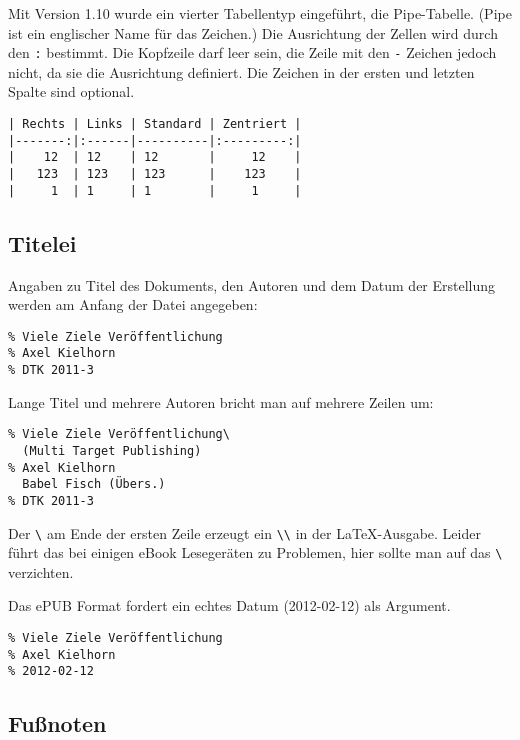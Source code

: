\documentclass[11pt,ngerman,a4paper]{article}
\begin{document}
Mit Version 1.10 wurde ein vierter Tabellentyp eingeführt, die
Pipe-Tabelle. (Pipe ist ein englischer Name für das \texttt{\textbar{}}
Zeichen.) Die Ausrichtung der Zellen wird durch den \texttt{:} bestimmt.
Die Kopfzeile darf leer sein, die Zeile mit den \texttt{-} Zeichen
jedoch nicht, da sie die Ausrichtung definiert. Die \texttt{\textbar{}}
Zeichen in der ersten und letzten Spalte sind optional.

\begin{verbatim}
| Rechts | Links | Standard | Zentriert | 
|-------:|:------|----------|:---------:| 
|    12  | 12    | 12       |     12    | 
|   123  | 123   | 123      |    123    |
|     1  | 1     | 1        |     1     |
\end{verbatim}

\subsection{Titelei}

Angaben zu Titel des Dokuments, den Autoren und dem Datum der Erstellung
werden am Anfang der Datei angegeben:

\begin{verbatim}
% Viele Ziele Veröffentlichung
% Axel Kielhorn
% DTK 2011-3
\end{verbatim}

Lange Titel und mehrere Autoren bricht man auf mehrere Zeilen um:

\begin{verbatim}
% Viele Ziele Veröffentlichung\
  (Multi Target Publishing)
% Axel Kielhorn
  Babel Fisch (Übers.)
% DTK 2011-3
\end{verbatim}

Der \texttt{\textbackslash{}} am Ende der ersten Zeile erzeugt ein
\texttt{\textbackslash{}\textbackslash{}} in der LaTeX-Ausgabe. Leider
führt das bei einigen eBook Lesegeräten zu Problemen, hier sollte man
auf das \texttt{\textbackslash{}} verzichten.

Das ePUB Format fordert ein echtes Datum (2012-02-12) als Argument.

\begin{verbatim}
% Viele Ziele Veröffentlichung
% Axel Kielhorn
% 2012-02-12
\end{verbatim}

\subsection{Fußnoten}
\end{document}
